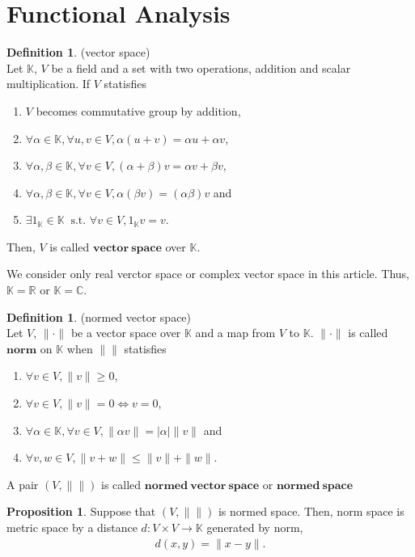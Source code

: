 \documentclass[11pt, a4paper, english, dvipdfmx]{jsarticle}
\theoremstyle{definition}
\newtheorem{Definition+}[Axiom+]{Definition}
\newtheorem{Proposition+}[Axiom+]{Proposition}
\newcommand{\R}{\mathbb{R}}
\newcommand{\C}{\mathbb{C}}
\newcommand{\K}{\mathbb{K}}
\begin{document}
\section{Functional Analysis}
\begin{Definition+}(vector space)\\
    Let $\K$, $V$ be a field and a set with two operations, addition and scalar multiplication.
    If $V$ statisfies
    \begin{enumerate}
        \item $V$ becomes commutative group by addition,
        \item $\forall\alpha\in\K, \forall u, v\in V, \alpha(u + v) = \alpha u + \alpha v$,
        \item $\forall \alpha, \beta\in\K, \forall v\in V, (\alpha + \beta)v = \alpha v + \beta v$,
        \item $\forall \alpha, \beta\in\K, \forall v\in V, \alpha(\beta v) = (\alpha\beta)v$ and 
        \item $\exists 1_{\K}\in\K~\text{ s.t. }\forall v\in V, 1_{\K}v = v$.
    \end{enumerate}
    Then, $V$ is called $\mathbf{vector~space}$ over $\K$.
\end{Definition+}
We consider only real verctor space or complex vector space in this article. Thus, 
$\K = \R$ or $\K = \C$.
\begin{Definition+}(normed vector space)\\
    Let $V$, $\|\cdot\|$ be a vector space over $\K$ and a map from $V$ to $\K$.
    $\|\cdot\|$ is called $\mathbf{norm}$ on $\K$ when $\|\|$ statisfies 
    \begin{enumerate}
        \item $\forall v\in V, \|v\| \geq 0$,
        \item $\forall v\in V, \|v\| = 0 \iff v = 0$,
        \item $\forall \alpha\in\K, \forall v\in V, \|\alpha v\| = |\alpha|\|v\|$ and 
        \item $\forall v, w\in V, \|v + w\|\leq \|v\| + \|w\|$.
    \end{enumerate}
    A pair $(V, \|\|)$ is called $\mathbf{normed~vector~space}$ or $\mathbf{normed~space}$
\end{Definition+}
\begin{Proposition+}
    Suppose that $(V, \|\|)$ is normed space.
    Then, norm space is metric space by a distance $d:V\times V\to\K$ generated  by norm,
    \begin{align*}
        d(x, y) = \|x - y\|.
    \end{align*}
\end{Proposition+}
\end{document}
